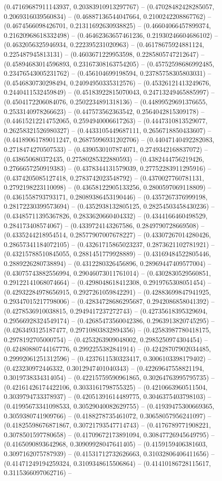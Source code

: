 (0.47169687911143937, 0.20383910913297767) -- (0.47028482428285057, 0.2069316039560834) -- (0.46887136544047664, 0.2100242208867762) -- (0.4674566098426701, 0.21311692630938825) -- (0.46604066457899374, 0.21620968618332498) -- (0.46462363657461236, 0.21930246604686102) -- (0.4632056325946934, 0.222395231020963) -- (0.46178675924881124, 0.225487945813131) -- (0.4603671229953598, 0.2285805747212647) -- (0.45894683014596893, 0.23167308163754205) -- (0.45752598686992485, 0.23476543005231762) -- (0.456104699198594, 0.23785758305803031) -- (0.4546830730298494, 0.24094950335312576) -- (0.45326121413249676, 0.2440411532459849) -- (0.45183922815070043, 0.24713249465885997) -- (0.4504172206084076, 0.2502234891318136) -- (0.44899529691376655, 0.2533140978266623) -- (0.447573562363542, 0.2564042815309178) -- (0.44615212214752065, 0.2594940006617263) -- (0.4447310813529077, 0.26258321526980327) -- (0.4433105449687111, 0.2656718850433607) -- (0.44189061789011247, 0.26875996931202706) -- (0.44047140492282083, 0.2718474270507533) -- (0.4390530107874071, 0.2749342168837072) -- (0.438650680372435, 0.27580285322880593) -- (0.4382444756219426, 0.2766657250919383) -- (0.4378344131579039, 0.27752283911295916) -- (0.4374205085127418, 0.2783742023548792) -- (0.4370027760781131, 0.2792198223110098) -- (0.43658122905133256, 0.2800597069118809) -- (0.4361558793793171, 0.28089386453190446) -- (0.4357267376999198, 0.28172230399573694) -- (0.4352938132805125, 0.28254503458430236) -- (0.43485711395367826, 0.2833620660404332) -- (0.4344166460498529, 0.284173408574067) -- (0.4339724143267586, 0.2849790728669508) -- (0.4335244218954514, 0.28577907007678227) -- (0.43307267014280426, 0.28657341184072105) -- (0.43261715865023237, 0.2873621102781921) -- (0.43215788510845055, 0.2881451779928889) -- (0.43169484522805446, 0.2889226280738894) -- (0.4312280326456896, 0.28969447409577004) -- (0.43075743882556994, 0.29046073011761014) -- (0.4302830529560851, 0.29122141068074664) -- (0.4298048618412308, 0.2919765308051454) -- (0.42932284978656915, 0.2927261059842291) -- (0.42883699847941925, 0.29347015217798006) -- (0.42834728686295687, 0.2942086858041392) -- (0.4278536910038815, 0.2949417237272743) -- (0.42735618395329694, 0.29566928324549174) -- (0.42685473560042386, 0.2963913820745295) -- (0.4263493125187477, 0.29710803832894356) -- (0.42583987780418175, 0.2978192705000754) -- (0.4253263909048002, 0.2985250974304454) -- (0.42480880744167776, 0.2992255382841914) -- (0.42428707902034485, 0.29992061251312596) -- (0.4237611530323417, 0.3006103398179402) -- (0.423230972446332, 0.3012947401040343) -- (0.42269647558821194, 0.3019738334314054) -- (0.42215759590961865, 0.30264763995795735) -- (0.42161426174422106, 0.3033161798755325) -- (0.4210663960511504, 0.3039794733378937) -- (0.42051391614489775, 0.3046375403798103) -- (0.41995673341098533, 0.30529040082629755) -- (0.41939475300669365, 0.3059380741909766) -- (0.4188278735461072, 0.30658057956241097) -- (0.41825598676871867, 0.30721793547714743) -- (0.4176789771908221, 0.3078501597780658) -- (0.41709672173891094, 0.30847726945649795) -- (0.4165090893642968, 0.30909928047641405) -- (0.4159159406381603, 0.3097162075787939) -- (0.41531712732626663, 0.31032806406411656) -- (0.41471249194259324, 0.3109348615506864) -- (0.41410186728115617, 0.3115366097062716) -- 